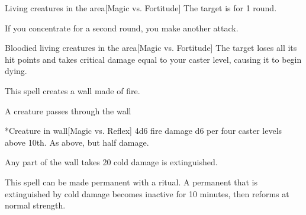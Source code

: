 \begin{spellheader}
\end{spellheader}
\begin{spelleffects}
    \begin{spelltargets}{Living creatures in the area}[Magic vs. Fortitude]
        \spellsuccess The target is \staggered for 1 round.
    \end{spelltargets}
    \spellspecial If you concentrate for a second round, you make another attack.
    \begin{spelltargets}{Bloodied living creatures in the area}[Magic vs. Fortitude]
        \spellsuccess The target loses all its hit points and takes critical damage equal to your caster level, causing it to begin dying.
    \end{spelltargets}
\end{spelleffects}

\begin{spellheader}
    \spelldur{\durshort}
\end{spellheader}
\begin{spelleffects}
    \spelleffect This spell creates a wall made of fire.
    \begin{spelltrigger}{A creature passes through the wall}
        \begin{spelltarget}*{Creature in wall}[Magic vs. Reflex]
            \spellsuccess 4d6 fire damage \add d6 per four caster levels above 10th.
            \spellfailure As above, but half damage.
        \end{spelltarget}
    \end{spelltrigger}
\end{spelleffects}
\begin{spellfooter}
    \spellnotes Any part of the wall takes 20 cold damage is extinguished.

    This spell can be made permanent with a  ritual. A permanent  that is extinguished by cold damage becomes inactive for 10 minutes, then reforms at normal strength.
\end{spellfooter}

